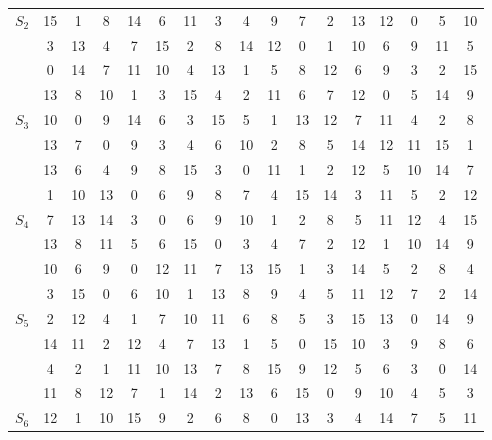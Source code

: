 \documentclass[12pt]{article}
\begin{document}
\begin{enumerate}
\begin{itemize}
\begin{enumerate}
\begin{table}[hbtp]
						\end{table}
				\end{enumerate}
				\begin{table}[hbtp]
					\centering
					\begin{tabular}{ccccccccccccccccc}
						\multirow{4}{*}{$S_2$}
						 & 15 &  1 &  8 & 14 &  6 & 11 &  3 &  4 &  9 &  7 &  2 & 13 & 12 &  0 &  5 & 10\\
						 &  3 & 13 &  4 &  7 & 15 &  2 &  8 & 14 & 12 &  0 &  1 & 10 &  6 &  9 & 11 &  5\\
						 &  0 & 14 &  7 & 11 & 10 &  4 & 13 &  1 &  5 &  8 & 12 &  6 &  9 &  3 &  2 & 15\\
						 & 13 &  8 & 10 &  1 &  3 & 15 &  4 &  2 & 11 &  6 &  7 & 12 &  0 &  5 & 14 &  9\\
						\hline
						\multirow{4}{*}{$S_3$}
						 & 10 &  0 &  9 & 14 &  6 &  3 & 15 &  5 &  1 & 13 & 12 &  7 & 11 &  4 &  2 &  8\\
						 & 13 &  7 &  0 &  9 &  3 &  4 &  6 & 10 &  2 &  8 &  5 & 14 & 12 & 11 & 15 &  1\\
						 & 13 &  6 &  4 &  9 &  8 & 15 &  3 &  0 & 11 &  1 &  2 & 12 &  5 & 10 & 14 &  7\\
						 &  1 & 10 & 13 &  0 &  6 &  9 &  8 &  7 &  4 & 15 & 14 &  3 & 11 &  5 &  2 & 12\\
						\hline
						\multirow{4}{*}{$S_4$}
						 & 7 &  13 & 14 &  3 &  0 &  6 &  9 & 10 &  1 &  2 &  8 &  5 & 11 & 12 &  4 & 15\\
						 & 13 &  8 & 11 &  5 &  6 & 15 &  0 &  3 &  4 &  7 &  2 & 12 &  1 & 10 & 14 &  9\\
						 & 10 &  6 &  9 &  0 & 12 & 11 &  7 & 13 & 15 &  1 &  3 & 14 &  5 &  2 &  8 &  4\\
						 &  3 & 15 &  0 &  6 & 10 &  1 & 13 &  8 &  9 &  4 &  5 & 11 & 12 &  7 &  2 & 14\\
						\hline
						\multirow{4}{*}{$S_5$}
						 &  2 & 12 &  4 &  1 &  7 & 10 & 11 &  6 &  8 &  5 &  3 & 15 & 13 &  0 & 14 &  9\\
						 & 14 & 11 &  2 & 12 &  4 &  7 & 13 &  1 &  5 &  0 & 15 & 10 &  3 &  9 &  8 &  6\\
						 &  4 &  2 &  1 & 11 & 10 & 13 &  7 &  8 & 15 &  9 & 12 &  5 &  6 &  3 &  0 & 14\\
						 & 11 &  8 & 12 &  7 &  1 & 14 &  2 & 13 &  6 & 15 &  0 &  9 & 10 &  4 &  5 &  3\\
						\hline
						\multirow{4}{*}{$S_6$}
						 & 12 &  1 & 10 & 15 &  9 &  2 &  6 &  8 &  0 & 13 &  3 &  4 & 14 &  7 &  5 & 11\\

\end{tabular}
\end{table}
\end{itemize}
\end{enumerate}
\end{document}
